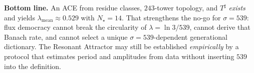 \noindent
\textbf{Bottom line.}
An ACE from residue classes, \(243\)-tower topology, and \(T^\sharp\)
\emph{exists} and yields \(\lambda_{\mathrm{mean}}\approx 0.529\) with
\(N_\star=14\). That strengthens the no-go for \(\sigma=539\): flux democracy
cannot break the circularity of \(\lambda=\ln 3/539\), cannot derive that
Banach rate, and cannot select a unique \(\sigma=539\)-dependent generational
dictionary. The Resonant Attractor may still be established \emph{empirically}
by a protocol that estimates period and amplitudes from data without inserting
\(539\) into the definition.

